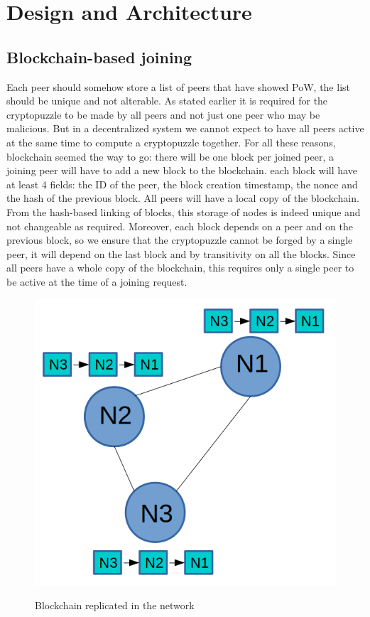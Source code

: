 \documentclass[twocolumn]{article}
\begin{document}
\section{Design and Architecture}
\subsection{Blockchain-based joining}
Each peer should somehow store a list of peers that have showed PoW, the list should be unique and not alterable. As stated earlier it is required for the cryptopuzzle to be made by all peers and not just one peer who may be malicious. But in a decentralized system we cannot expect to have all peers active at the same time to compute a cryptopuzzle together. For all these reasons, blockchain seemed the way to go: there will be one block per joined peer, a joining peer will have to add a new block to the blockchain. each block will have at least 4 fields: the ID of the peer, the block creation timestamp, the nonce and the hash of the previous block.
\linebreak
\linebreak
All peers will have a local copy of the blockchain. From the hash-based linking of blocks, this storage of nodes is indeed unique and not changeable as required. Moreover, each block depends on a peer and on the previous block, so we ensure that the cryptopuzzle cannot be forged by a single peer, it will depend on the last block and by transitivity on all the blocks. Since all peers have a whole copy of the blockchain, this requires only a single peer to be active at the time of a joining request.
\begin{figure}[h]
	\caption{Blockchain replicated in the network}
	\centering
	\includegraphics[scale=0.4]{network}
	\label{fig:network}
\end{figure}
\end{document}
